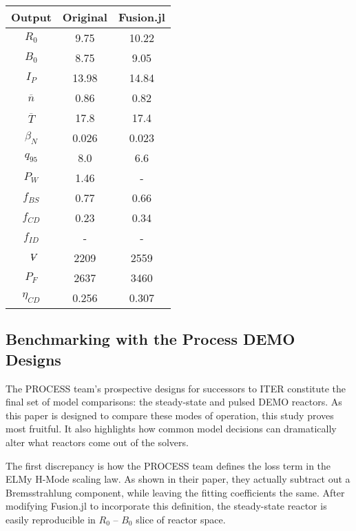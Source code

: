 \begin{table}[h!]
\begin{subtable}[t]{0.5\textwidth}
\begin{tabular}{ c|c|c }
Output           & Original         & Fusion.jl        \\
\hline
$R_{0}$          & 9.75             & 10.22           \\
$B_{0}$          & 8.75             & 9.05           \\
$I_{P}$          & 13.98            & 14.84           \\
$\overline n$    & 0.86             & 0.82          \\
$\overline T$    & 17.8             & 17.4           \\
$\beta_{N}$       & 0.026            & 0.023          \\
$q_{95}$         & 8.0              & 6.6           \\
$P_{W}$          & 1.46             & -            \\
$f_{BS}$         & 0.77             & 0.66           \\
$f_{CD}$         & 0.23             & 0.34           \\
$f_{ID}$         & -              & -             \\
$\volume$         & 2209           & 2559          \\
$P_{F}$          & 2637           & 3460          \\
$\eta_{CD}$      & 0.256            & 0.307           \\

\end{tabular}
\end{subtable}
\hfill
\hfill
\end{table}

\newpage

\subsection{Benchmarking with the Process DEMO Designs}

The PROCESS team's prospective designs for successors to ITER constitute the final set of model comparisons: the steady-state and pulsed DEMO reactors. As this paper is designed to compare these modes of operation, this study proves most fruitful. It also highlights how common model decisions can dramatically alter what reactors come out of the solvers.

The first discrepancy is how the PROCESS team defines the loss term in the ELMy H-Mode scaling law. As shown in their paper, they actually subtract out a Bremsstrahlung component, while leaving the fitting coefficients the same. \cite{process} After modifying Fusion.jl to incorporate this definition, the steady-state reactor is easily reproducible in $R_0$ -- $B_0$ slice of reactor space.

